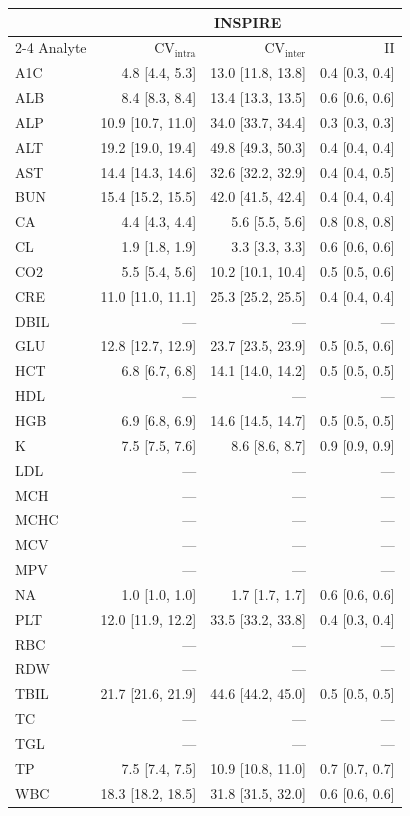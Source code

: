 \begin{table}[ht]
\centering
\tiny
\begin{tabular}{lrrr}
\toprule
  & \multicolumn{3}{c}{INSPIRE} \\
\cmidrule(lr){2-4}
Analyte & CV$_{\text{intra}}$ & CV$_{\text{inter}}$ & II \\
\midrule
A1C & 4.8 [4.4, 5.3] & 13.0 [11.8, 13.8] & 0.4 [0.3, 0.4] \\
ALB & 8.4 [8.3, 8.4] & 13.4 [13.3, 13.5] & 0.6 [0.6, 0.6] \\
ALP & 10.9 [10.7, 11.0] & 34.0 [33.7, 34.4] & 0.3 [0.3, 0.3] \\
ALT & 19.2 [19.0, 19.4] & 49.8 [49.3, 50.3] & 0.4 [0.4, 0.4] \\
AST & 14.4 [14.3, 14.6] & 32.6 [32.2, 32.9] & 0.4 [0.4, 0.5] \\
BUN & 15.4 [15.2, 15.5] & 42.0 [41.5, 42.4] & 0.4 [0.4, 0.4] \\
CA & 4.4 [4.3, 4.4] & 5.6 [5.5, 5.6] & 0.8 [0.8, 0.8] \\
CL & 1.9 [1.8, 1.9] & 3.3 [3.3, 3.3] & 0.6 [0.6, 0.6] \\
CO2 & 5.5 [5.4, 5.6] & 10.2 [10.1, 10.4] & 0.5 [0.5, 0.6] \\
CRE & 11.0 [11.0, 11.1] & 25.3 [25.2, 25.5] & 0.4 [0.4, 0.4] \\
DBIL & --- & --- & --- \\
GLU & 12.8 [12.7, 12.9] & 23.7 [23.5, 23.9] & 0.5 [0.5, 0.6] \\
HCT & 6.8 [6.7, 6.8] & 14.1 [14.0, 14.2] & 0.5 [0.5, 0.5] \\
HDL & --- & --- & --- \\
HGB & 6.9 [6.8, 6.9] & 14.6 [14.5, 14.7] & 0.5 [0.5, 0.5] \\
K & 7.5 [7.5, 7.6] & 8.6 [8.6, 8.7] & 0.9 [0.9, 0.9] \\
LDL & --- & --- & --- \\
MCH & --- & --- & --- \\
MCHC & --- & --- & --- \\
MCV & --- & --- & --- \\
MPV & --- & --- & --- \\
NA & 1.0 [1.0, 1.0] & 1.7 [1.7, 1.7] & 0.6 [0.6, 0.6] \\
PLT & 12.0 [11.9, 12.2] & 33.5 [33.2, 33.8] & 0.4 [0.3, 0.4] \\
RBC & --- & --- & --- \\
RDW & --- & --- & --- \\
TBIL & 21.7 [21.6, 21.9] & 44.6 [44.2, 45.0] & 0.5 [0.5, 0.5] \\
TC & --- & --- & --- \\
TGL & --- & --- & --- \\
TP & 7.5 [7.4, 7.5] & 10.9 [10.8, 11.0] & 0.7 [0.7, 0.7] \\
WBC & 18.3 [18.2, 18.5] & 31.8 [31.5, 32.0] & 0.6 [0.6, 0.6] \\
\bottomrule
\end{tabular}
\label{tab:08_variability}
\end{table}